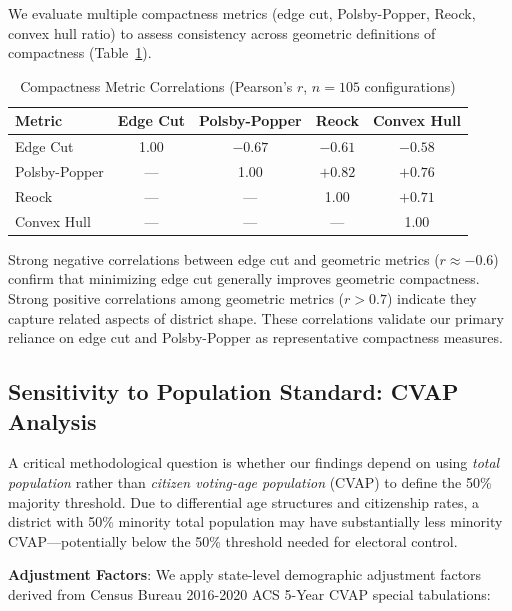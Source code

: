 We evaluate multiple compactness metrics (edge cut, Polsby-Popper, Reock, convex hull ratio) to assess consistency across geometric definitions of compactness (Table~\ref{tab:metric-correlation}).

\begin{table}[htbp]
\centering
\caption{Compactness Metric Correlations (Pearson's $r$, $n=105$ configurations)}
\label{tab:metric-correlation}
\begin{tabular}{lcccc}
\toprule
\textbf{Metric} & \textbf{Edge Cut} & \textbf{Polsby-Popper} & \textbf{Reock} & \textbf{Convex Hull} \\
\midrule
Edge Cut        & 1.00 & $-0.67$ & $-0.61$ & $-0.58$ \\
Polsby-Popper   & --- & 1.00 & $+0.82$ & $+0.76$ \\
Reock           & --- & --- & 1.00 & $+0.71$ \\
Convex Hull     & --- & --- & --- & 1.00 \\
\bottomrule
\end{tabular}
\end{table}

Strong negative correlations between edge cut and geometric metrics ($r \approx -0.6$) confirm that minimizing edge cut generally improves geometric compactness. Strong positive correlations among geometric metrics ($r > 0.7$) indicate they capture related aspects of district shape. These correlations validate our primary reliance on edge cut and Polsby-Popper as representative compactness measures.

\subsection{Sensitivity to Population Standard: CVAP Analysis}

A critical methodological question is whether our findings depend on using \emph{total population} rather than \emph{citizen voting-age population} (CVAP) to define the 50\% majority threshold. Due to differential age structures and citizenship rates, a district with 50\% minority total population may have substantially less minority CVAP---potentially below the 50\% threshold needed for electoral control.

\textbf{Adjustment Factors}: We apply state-level demographic adjustment factors derived from Census Bureau 2016-2020 ACS 5-Year CVAP special tabulations:

